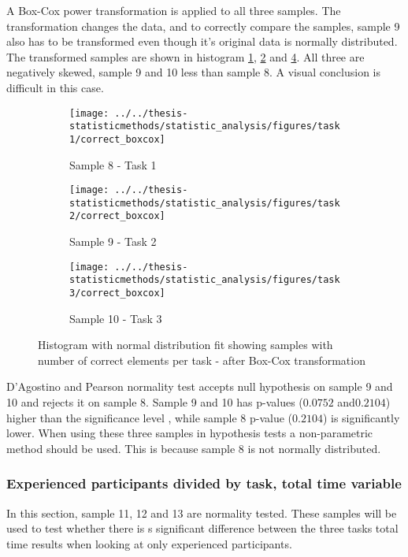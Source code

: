 A Box-Cox power transformation is applied to all three samples. The transformation changes the data, and to correctly compare the samples, sample 9 also has to be transformed even though it's original data is normally distributed. The transformed samples are shown in histogram \ref{fig:correctboxcox_task1}, \ref{fig:correctboxcox_task2} and \ref{fig:correctboxcox_task3}. All three are negatively skewed, sample 9 and 10 less than sample 8. A visual conclusion is difficult in this case. \\[0.2cm]


\begin{figure}[h!]
	\centering
	\begin{subfigure}[b]{0.3\textwidth}
		\centering
		\texttt{[image: ../../thesis-statisticmethods/statistic\_analysis/figures/task1/correct\_boxcox]}
		\caption{Sample 8 - Task 1}
		\label{fig:correctboxcox_task1}
	\end{subfigure}
	\begin{subfigure}[b]{0.3\textwidth}
		\centering
		\texttt{[image: ../../thesis-statisticmethods/statistic\_analysis/figures/task2/correct\_boxcox]}
		\caption{Sample 9 - Task 2}
		\label{fig:correctboxcox_task2}
	\end{subfigure}
	\begin{subfigure}[b]{0.3\textwidth}
		\centering
		\texttt{[image: ../../thesis-statisticmethods/statistic\_analysis/figures/task3/correct\_boxcox]}
		\caption{Sample 10 - Task 3}
		\label{fig:correctboxcox_task3}
	\end{subfigure}
	\caption{Histogram with normal distribution fit showing samples with number of correct elements per task - after Box-Cox transformation}
\end{figure}

D'Agostino and Pearson normality test accepts null hypothesis on sample 9 and 10 and rejects it on sample 8. Sample 9 and 10 has p-values ($0.0752$ and$0.2104$) higher than the significance level , while sample 8 p-value ($0.2104$) is significantly lower. When using these three samples in hypothesis tests a non-parametric method should be used. This is because sample 8 is not normally distributed. 

\subsubsection[Sample 11, 12 and 13]{Experienced participants divided by task, total time variable}
In this section, sample 11, 12 and 13 are normality tested. These samples will be used to test whether there is s significant difference between the three tasks total time results when looking at only experienced participants. 

